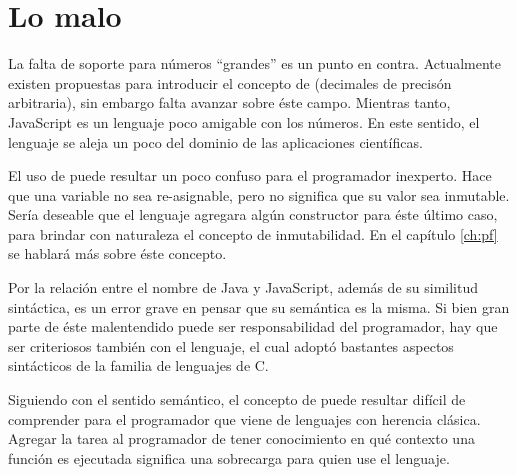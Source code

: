 \section*{Lo malo}

La falta de soporte para números "`grandes"' es un punto en contra. Actualmente existen propuestas para introducir el concepto de  (decimales de precisón arbitraria), sin embargo falta avanzar sobre éste campo. Mientras tanto, JavaScript es un lenguaje poco amigable con los números. En este sentido, el lenguaje se aleja un poco del dominio de las aplicaciones científicas.

El uso de  puede resultar un poco confuso para el programador inexperto. Hace que una variable no sea re-asignable, pero no significa que su valor sea inmutable. Sería deseable que el lenguaje agregara algún constructor para éste último caso, para brindar con naturaleza el concepto de inmutabilidad. En el capítulo \ref{ch:pf} se hablará más sobre éste concepto.

Por la relación entre el nombre de Java y JavaScript, además de su similitud sintáctica, es un error grave en pensar que su semántica es la misma. Si bien gran parte de éste malentendido puede ser responsabilidad del programador, hay que ser criteriosos también con el lenguaje, el cual adoptó bastantes aspectos sintácticos de la familia de lenguajes de C.

Siguiendo con el sentido semántico, el concepto de  puede resultar difícil de comprender para el programador que viene de lenguajes con herencia clásica. Agregar la tarea al programador de tener conocimiento en qué contexto una función es ejecutada significa una sobrecarga para quien use el lenguaje.